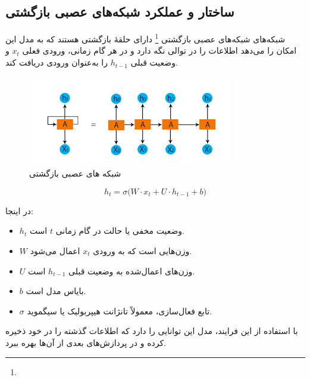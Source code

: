 \subsection{ساختار و عملکرد شبکه‌های عصبی بازگشتی}
شبکه‌های شبکه‌های عصبی بازگشتی \footnote{} دارای حلقهٔ بازگشتی هستند که به مدل این امکان را می‌دهد اطلاعات را در توالی نگه دارد و در هر گام زمانی، ورودی فعلی \( x_t \) و وضعیت قبلی \( h_{t-1} \) را به‌عنوان ورودی دریافت کند\cite{goodfellow2016deep}.




\begin{figure}[h]
	\centering
	\begin{minipage}[b]{0.7\textwidth}
		\centering
		\includegraphics[width=\textwidth]{transformer_images/rnn_image.png}
		\caption{شبکه های عصبی بازگشتی}
		\label{fig:recurrent neural network}
	\end{minipage}
	\hfill
	
\end{figure}



\begin{equation}
	h_t = \sigma \big( W \cdot x_t + U \cdot h_{t-1} + b \big)
\end{equation}

در اینجا:
\begin{itemize}
	\item \( h_t \) وضعیت مخفی یا حالت در گام زمانی \( t \) است.
	\item \( W \) وزن‌هایی است که به ورودی \( x_t \) اعمال می‌شود.
	\item \( U \) وزن‌های اعمال‌شده به وضعیت قبلی \( h_{t-1} \) است.
	\item \( b \) بایاس مدل است.
	\item \( \sigma \) تابع فعال‌سازی، معمولاً تانژانت هیپربولیک یا سیگموید.
\end{itemize}

با استفاده از این فرایند، مدل این توانایی را دارد که اطلاعات گذشته را در خود ذخیره کرده و در پردازش‌های بعدی از آن‌ها بهره ببرد.

